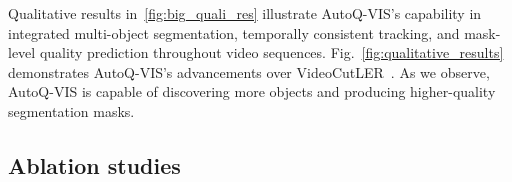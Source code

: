 Qualitative results in~\cref{fig:big_quali_res} illustrate AutoQ-VIS's capability in integrated multi-object segmentation, temporally consistent tracking, and mask-level quality prediction throughout video sequences. Fig.~\ref{fig:qualitative_results} demonstrates AutoQ-VIS's advancements over VideoCutLER~\cite{videocutler}. As we observe, AutoQ-VIS is capable of discovering more objects and producing higher-quality segmentation masks.

\subsection{Ablation studies}

